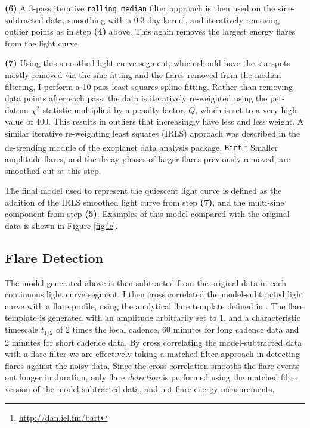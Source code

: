 \documentclass[twocolumn]{aastex6}
\begin{document}
{\bf (6)} A 3-pass iterative {\tt rolling\_median} filter approach is then used on the sine-subtracted data, smoothing with a 0.3 day kernel, and iteratively removing outlier points as in step {\bf (4)} above. This again removes the largest energy flares from the light curve.

{\bf (7)} Using this smoothed light curve segment, which should have the starspots mostly removed via the sine-fitting and the flares removed from the median filtering, I perform a 10-pass least squares spline fitting. Rather than removing data points after each pass, the data is iteratively re-weighted \citep[e.g. see][]{green1984} using the per-datum $\chi^2$ statistic multiplied by a penalty factor, $Q$, which is set to a very high value of 400. This results in outliers that increasingly have less and less weight. A similar iterative re-weighting least squares (IRLS) approach was described in the de-trending module of the exoplanet data analysis package, {\tt Bart}.\footnote{\url{http://dan.iel.fm/bart}} Smaller amplitude flares, and the decay phases of larger flares previously removed, are smoothed out at this step.

The final model used to represent the quiescent light curve is defined as the addition of the IRLS smoothed light curve from step {\bf (7)}, and the multi-sine component from step {\bf (5)}. Examples of this model compared with the original data is shown in Figure \ref{fig:lc}.





\subsection{Flare Detection}
\label{sec:find2}

The model generated above is then subtracted from the original data in each continuous light curve segment. I then cross correlated the model-subtracted light curve with a flare profile, using the analytical flare template defined in \citet{davenport2014b}. The flare template is generated with an amplitude arbitrarily set to 1, and a characteristic timescale $t_{1/2}$ of 2 times the local cadence, 60 minutes for long cadence data and 2 minutes for short cadence data. By cross correlating the model-subtracted data with a flare filter we are effectively taking a matched filter approach in detecting flares against the noisy data. Since the cross correlation smooths the flare events out longer in duration, only flare {\it detection} is performed using the matched filter version of the model-subtracted data, and not flare energy measurements.
\end{document}
